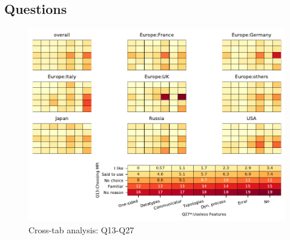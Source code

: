 
\subsection{Questions}


\begin{figure}
\begin{center}
\includegraphics[width=12cm]{../pdfs/Q13-Q27.pdf}
\caption{Cross-tab analysis: Q13-Q27}
\label{fig:Q13-Q27}
\end{center}
\end{figure}
